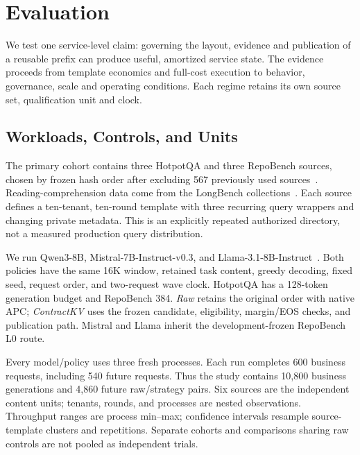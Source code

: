\section{Evaluation}
\label{sec:evaluation}
We test one service-level claim: governing the layout, evidence and publication of a reusable prefix can produce useful, amortized service state. The evidence proceeds from template economics and full-cost execution to behavior, governance, scale and operating conditions. Each regime retains its own source set, qualification unit and clock.

\subsection{Workloads, Controls, and Units}
\label{sec:protocol}
The primary cohort contains three HotpotQA and three RepoBench sources, chosen by frozen hash order after excluding 567 previously used sources~\cite{hotpotqa2018,repobench2024}. Reading-comprehension data come from the LongBench collections~\cite{longbench2024}. Each source defines a ten-tenant, ten-round template with three recurring query wrappers and changing private metadata. This is an explicitly repeated authorized directory, not a measured production query distribution.

We run Qwen3-8B, Mistral-7B-Instruct-v0.3, and Llama-3.1-8B-Instruct~\cite{qwen32025,mistral2023,llama32024}. Both policies have the same 16K window, retained task content, greedy decoding, fixed seed, request order, and two-request wave clock. HotpotQA has a 128-token generation budget and RepoBench 384. \emph{Raw} retains the original order with native APC; \emph{ContractKV} uses the frozen candidate, eligibility, margin/EOS checks, and publication path. Mistral and Llama inherit the development-frozen RepoBench L0 route.

Every model/policy uses three fresh processes. Each run completes 600 business requests, including 540 future requests. Thus the study contains 10,800 business generations and 4,860 future raw/strategy pairs. Six sources are the independent content units; tenants, rounds, and processes are nested observations. Throughput ranges are process min--max; confidence intervals resample source-template clusters and repetitions. Separate cohorts and comparisons sharing raw controls are not pooled as independent trials.

